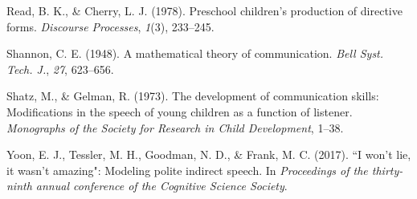 \documentclass[10pt, letterpaper]{article}
\begin{document}
\hypertarget{ref-read1978}{}
Read, B. K., \& Cherry, L. J. (1978). Preschool children's production of
directive forms. \emph{Discourse Processes}, \emph{1}(3), 233--245.

\hypertarget{ref-shannon1948}{}
Shannon, C. E. (1948). A mathematical theory of communication.
\emph{Bell Syst. Tech. J.}, \emph{27}, 623--656.

\hypertarget{ref-shatz1973}{}
Shatz, M., \& Gelman, R. (1973). The development of communication
skills: Modifications in the speech of young children as a function of
listener. \emph{Monographs of the Society for Research in Child
Development}, 1--38.

\hypertarget{ref-yoon2017}{}
Yoon, E. J., Tessler, M. H., Goodman, N. D., \& Frank, M. C. (2017). ``I
won't lie, it wasn't amazing": Modeling polite indirect speech. In
\emph{Proceedings of the thirty-ninth annual conference of the Cognitive
Science Society}.


\end{document}
